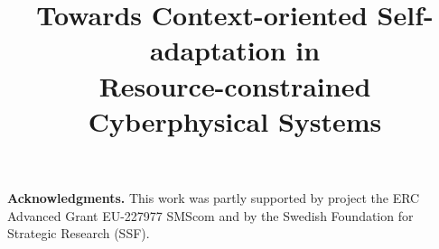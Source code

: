 \documentclass[conference]{IEEEtran}
\newcommand{\fakepar}[1]{\vspace{0mm}\noindent\textbf{#1.}}
\begin{document}
\title{Towards Context-oriented Self-adaptation in\\Resource-constrained Cyberphysical Systems}



\author{
\and
{}
\and
{}
}


\maketitle











\fakepar{Acknowledgments} This work was partly supported by project
the ERC Advanced Grant EU-227977 SMScom and by the Swedish
Foundation for Strategic Research (SSF).


\end{document}
